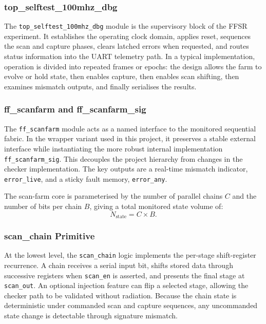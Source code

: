\subsubsection{top\_selftest\_100mhz\_dbg}

The \texttt{top\_selftest\_100mhz\_dbg} module is the supervisory block
of the FFSR experiment.  It establishes the operating clock domain,
applies reset, sequences the scan and capture phases, clears latched
errors when requested, and routes status information into the UART
telemetry path.  In a typical implementation, operation is divided into
repeated frames or epochs: the design allows the farm to evolve or hold
state, then enables capture, then enables scan shifting, then examines
mismatch outputs, and finally serialises the results.

\subsubsection{ff\_scanfarm and ff\_scanfarm\_sig}

The \texttt{ff\_scanfarm} module acts as a named interface to the
monitored sequential fabric.  In the wrapper variant used in this
project, it preserves a stable external interface while instantiating
the more robust internal implementation \texttt{ff\_scanfarm\_sig}.
This decouples the project hierarchy from changes in the checker
implementation.  The key outputs are a real-time mismatch indicator,
\texttt{error\_live}, and a sticky fault memory, \texttt{error\_any}.

The scan-farm core is parameterised by the number of parallel chains
$C$ and the number of bits per chain $B$, giving a total monitored
state volume of:
\begin{equation}
    N_\text{state} = C \times B.
    \label{eq:nstate}
\end{equation}

\subsubsection{scan\_chain Primitive}

At the lowest level, the \texttt{scan\_chain} logic implements the
per-stage shift-register recurrence.  A chain receives a serial input
bit, shifts stored data through successive registers when
\texttt{scan\_en} is asserted, and presents the final stage at
\texttt{scan\_out}.  An optional injection feature can flip a selected
stage, allowing the checker path to be validated without radiation.
Because the chain state is deterministic under commanded scan and
capture sequences, any uncommanded state change is detectable through
signature mismatch.

